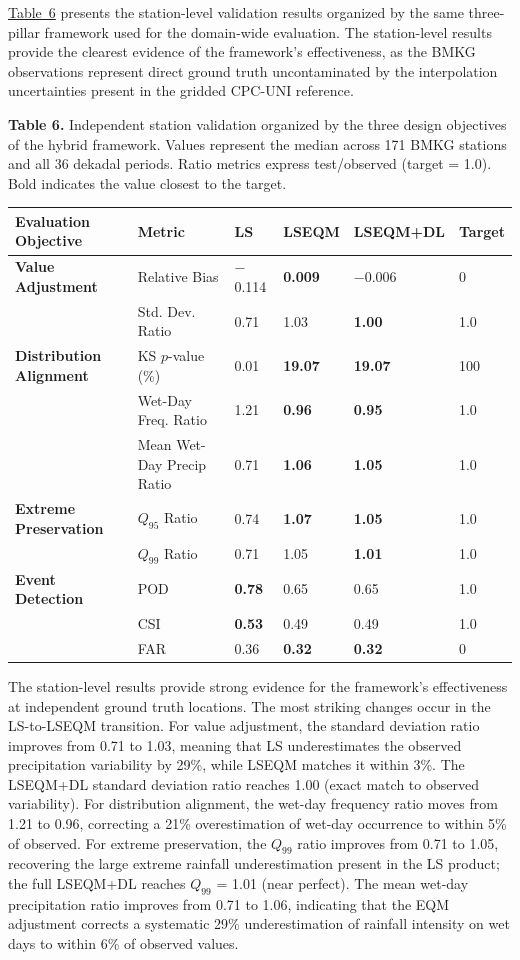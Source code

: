 \documentclass[11pt,a4paper]{article}
\begin{document}
\hyperref[tab:6]{Table~6} presents the station-level validation results organized by the
same three-pillar framework used for the domain-wide evaluation. The
station-level results provide the clearest evidence of the framework's
effectiveness, as the BMKG observations represent direct ground truth
uncontaminated by the interpolation uncertainties present in the gridded
CPC-UNI reference.

\label{tab:6}
\textbf{Table 6.} Independent station validation organized by the three
design objectives of the hybrid framework. Values represent the median
across 171 BMKG stations and all 36 dekadal periods. Ratio metrics
express test/observed (target = 1.0). Bold indicates the value closest
to the target.

\begingroup\small
\begin{longtable}[]{@{}llllll@{}}
\toprule
Evaluation Objective & Metric & LS & LSEQM & LSEQM+DL & Target \\
\midrule
\endhead
\bottomrule
\endlastfoot
\textbf{Value Adjustment} & Relative Bias & $-$0.114 & \textbf{0.009}
& $-$0.006 & 0 \\
& Std. Dev. Ratio & 0.71 & 1.03 & \textbf{1.00} & 1.0 \\
\textbf{Distribution Alignment} & KS \(p\)-value (\%) & 0.01 &
\textbf{19.07} & \textbf{19.07} & 100 \\
& Wet-Day Freq. Ratio & 1.21 & \textbf{0.96} & \textbf{0.95} & 1.0 \\
& Mean Wet-Day Precip Ratio & 0.71 & \textbf{1.06} & \textbf{1.05} &
1.0 \\
\textbf{Extreme Preservation} & \(Q_{95}\) Ratio & 0.74 & \textbf{1.07}
& \textbf{1.05} & 1.0 \\
& \(Q_{99}\) Ratio & 0.71 & 1.05 & \textbf{1.01} & 1.0 \\
\textbf{Event Detection} & POD & \textbf{0.78} & 0.65 & 0.65 & 1.0 \\
& CSI & \textbf{0.53} & 0.49 & 0.49 & 1.0 \\
& FAR & 0.36 & \textbf{0.32} & \textbf{0.32} & 0 \\
\end{longtable}
\endgroup

The station-level results provide strong evidence for the framework's
effectiveness at independent ground truth locations. The most striking
changes occur in the LS-to-LSEQM transition. For value adjustment, the
standard deviation ratio improves from 0.71 to 1.03, meaning that LS
underestimates the observed precipitation variability by 29\%, while
LSEQM matches it within 3\%. The LSEQM+DL standard deviation ratio
reaches 1.00 (exact match to observed variability). For distribution
alignment, the wet-day frequency ratio moves from 1.21 to 0.96,
correcting a 21\% overestimation of wet-day occurrence to within 5\% of
observed. For extreme preservation, the \(Q_{99}\) ratio improves from
0.71 to 1.05, recovering the large extreme rainfall underestimation
present in the LS product; the full LSEQM+DL reaches \(Q_{99}\) = 1.01
(near perfect). The mean wet-day precipitation ratio improves from 0.71
to 1.06, indicating that the EQM adjustment corrects a systematic 29\%
underestimation of rainfall intensity on wet days to within 6\% of
observed values.
\end{document}
